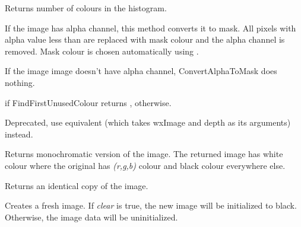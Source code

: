 Returns number of colours in the histogram.


\label{wximageconvertalphatomask}


If the image has alpha channel, this method converts it to mask. All pixels
with alpha value less than  are replaced with mask colour
and the alpha channel is removed. Mask colour is chosen automatically using
.

If the image image doesn't have alpha channel,
ConvertAlphaToMask does nothing.


\false if FindFirstUnusedColour returns \false, \true otherwise. 


\label{wximageconverttobitmap}


Deprecated, use equivalent 
(which takes wxImage and depth as its arguments) instead.


\label{wxbitmapconverttomono}


Returns monochromatic version of the image. The returned image has white
colour where the original has {\it (r,g,b)} colour and black colour 
everywhere else.


\label{wximagecopy}


Returns an identical copy of the image.


\label{wximagecreate}


Creates a fresh image.  If {\it clear} is true, the new image will be initialized to black.
Otherwise, the image data will be uninitialized.




